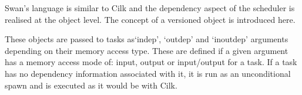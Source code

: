 Swan's language is similar to Cilk and the dependency aspect of the scheduler is realised at the object level. The concept of a versioned object is introduced here. 

These objects are passed to tasks as`indep', `outdep' and `inoutdep' arguments depending on their memory access type. These are defined if a given argument has a memory access mode of: input, output or input/output for a task. If a task has no dependency information associated with it, it is run as an unconditional spawn and is executed as it would be with Cilk.


